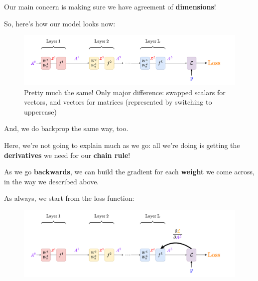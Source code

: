         
        
        
        
        
        
        Our main concern is making sure we have agreement of \textbf{dimensions}!
    
        So, here's how our model looks now:
        
        \begin{figure}[H]
            \centering
            \includegraphics[width=180mm,scale=0.4]{images/nn_2_images/network_bp_full.png}
            \caption*{Pretty much the same! Only major difference: swapped scalars for vectors, and vectors for matrices (represented by switching to uppercase)}
        \end{figure}
        
        And, we do backprop the same way, too.
        
        Here, we're not going to explain much as we go: all we're doing is getting the \textbf{derivatives} we need for our \textbf{chain rule}! 
        
        As we go \textbf{backwards}, we can build the gradient for each \textbf{weight} we come across, in the way we described above.
        
        As always, we start from the loss function:
        
        \begin{figure}[H]
            \centering
            \includegraphics[width=180mm,scale=0.4]{images/nn_2_images/network_bp_full1.png}
        \end{figure}
        
